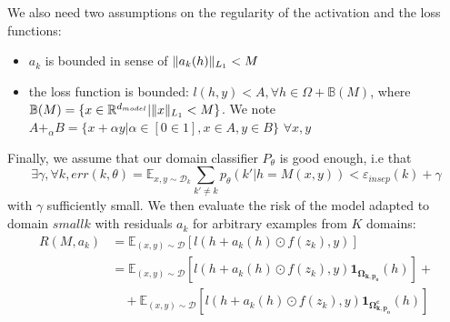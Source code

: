 \documentclass[12pt,times,a4paper,twoside]{article}
\newcommand{\fyTodo}[1]{\Todo[FY:]{\textcolor{orange}{#1}}}
\newcommand{\fyDone}[1]{\done[FY]\Todo[FY:]{\textcolor{orange}{#1}}}
\theoremstyle{definition}
\begin{document}
We also need two assumptions on the regularity of the activation and the loss functions:\fyTodo{Are these standard in such models - if yes, cite}
\begin{itemize}
\item $a_k$ is bounded in sense of $\normL{a_k(h)} < M$\fyTodo{$M$ is already used}
\item the loss function is bounded:  $l(h,y) < A, \forall h \in \Omega + \mathbb{B}(M)$, where $\mathbb{B}(M)=\lbrace x\in \mathbb{R}^{d_{model}} | \normL{x}<M \rbrace$. We note $A +_{\alpha}B = \lbrace x+ \alpha y  | \alpha \in [0 \in 1], x \in A, y \in B \rbrace$ \fyTodo{Notation $A$ is a scalar, not a set}
  $\forall x,y$
\end{itemize}

Finally, we assume that our domain classifier $P_\theta$ is good enough, i.e that\fyDone{Attention à $p$}
$$\exists \gamma, \forall k, err(k, \theta) = \mathbb{E}_{x,y \sim \mathcal{D}_{k}} \sum_{k' \neq k} p_\theta(k'|h=M(x,y)) < \varepsilon_{insep}(k) + \gamma$$ with $\gamma$ sufficiently small.
We then evaluate the risk of the model adapted to domain $smallk$ with residuals $a_k$ for arbitrary examples from $K$ domains:\fyTodo{(x,y) is sampled from some distribution}
\begin{equation}
\begin{split}
  R(M,a_k) &= \mathbb{E}_{(x,y) \sim \mathcal{D}}[l(h + a_k(h) \odot f(z_k),y)] \\
  &= \mathbb{E}_{(x,y) \sim \mathcal{D}}[l(h + a_k(h) \odot f(z_k),y)\mathbf{1}_{\mathbf{\Omega_{k,p_{0}}}}(h)] + \\
  &\quad + \mathbb{E}_{(x,y) \sim \mathcal{D}}[l(h + a_k(h) \odot f(z_k),y) \mathbf{1}_{\mathbf{\Omega_{k,p_{0}}^{c}}}(h)]
\end{split}
\end{equation}
\end{document}
